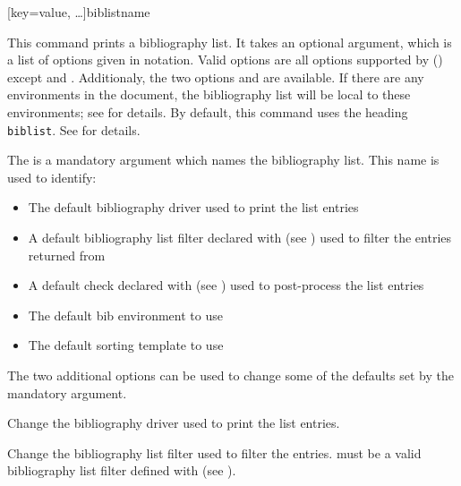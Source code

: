 \documentclass{ltxdockit}[2011/03/25]
\newcommand*{\biber}{\sty{biber}\xspace}
\begin{document}
\begin{ltxsyntax}

[key=value, \dots]{biblistname}

This command prints a bibliography list. It takes an optional argument, which is a list of options given in \keyval notation. Valid options are all options supported by  () except  and . Additionaly, the two options  and  are available. If there are any  environments in the document, the bibliography list will be local to these environments; see  for details. By default, this command uses the heading \texttt{biblist}. See  for details.


The  is a mandatory argument which names the bibliography list. This name is used to identify:
\begin{itemize}
\item The default bibliography driver used to print the list entries
\item A default bibliography list filter declared with  (see ) used to filter the entries returned from \biber
\item A default check declared with  (see ) used to post-process the list entries
\item The default bib environment to use
\item The default sorting template to use
\end{itemize}

The two additional options can be used to change some of the defaults set by the mandatory argument.

\begin{optionlist*}

Change the bibliography driver used to print the list entries.


Change the bibliography list filter used to filter the entries.  must be a valid bibliography list filter defined with  (see ).
\end{optionlist*}


\end{ltxsyntax}
\end{document}
